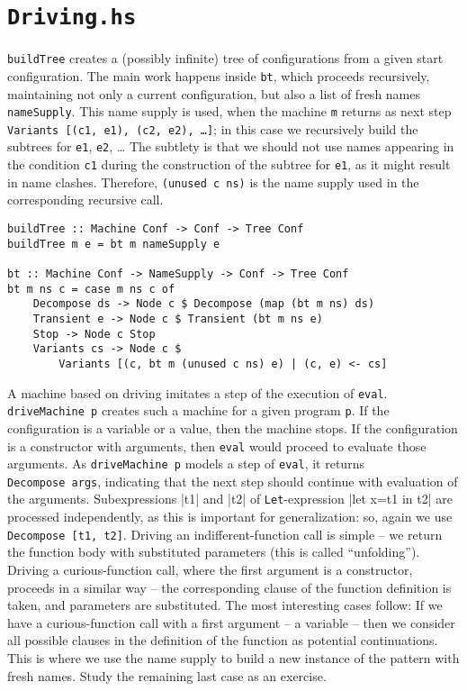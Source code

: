 \section{\texttt{Driving.hs}}

\texttt{buildTree} creates a (possibly infinite) tree of configurations from a given start configuration.
The main work happens inside \texttt{bt}, which proceeds recursively,
maintaining not only a current configuration, but also a list of fresh names \texttt{nameSupply}.
This name supply is used, when the machine \texttt{m} returns as next step
\texttt{Variants~[(c1,~e1),~(c2, e2),~\ldots]};
in this case we recursively build the subtrees for \texttt{e1}, \texttt{e2}, \ldots
The subtlety is that we should not use names appearing in the condition \texttt{c1}
during the construction of the subtree for \texttt{e1},
as it might result in name clashes.
Therefore, \texttt{(unused c ns)} is the name supply used in the corresponding recursive call.
\begin{lstlisting}[name=driving]
buildTree :: Machine Conf -> Conf -> Tree Conf
buildTree m e = bt m nameSupply e

bt :: Machine Conf -> NameSupply -> Conf -> Tree Conf
bt m ns c = case m ns c of
	Decompose ds -> Node c $ Decompose (map (bt m ns) ds)
	Transient e -> Node c $ Transient (bt m ns e)
	Stop -> Node c Stop
	Variants cs -> Node c $ 
		Variants [(c, bt m (unused c ns) e) | (c, e) <- cs]
\end{lstlisting}
A machine based on driving imitates a step of the execution of \texttt{eval}. 
\texttt{driveMachine~p} creates such a machine for a given program \texttt{p}.
If the configuration is a variable or a value, then the machine stops.
If the configuration is a constructor with arguments, then \texttt{eval}
would proceed to evaluate those arguments.
As \texttt{driveMachine~p} models a step of \texttt{eval},
it returns \texttt{Decompose~args},
indicating that the next step should continue with evaluation of the arguments.
Subexpressions |t1| and |t2| of \texttt{Let}-expression |let x=t1 in t2| are processed independently, as 
this is important for generalization: so, again we use \texttt{Decompose~[t1,~t2]}.
Driving an indifferent-function call is simple -- we return the function body
with substituted parameters (this is called ``unfolding'').
Driving a curious-function call, where the first argument is a constructor,
proceeds in a similar way -- the corresponding clause of the
function definition is taken, and parameters are substituted.
The most interesting cases follow:
If we have a curious-function call with a first argument -- a variable --
then we consider all possible clauses in the definition of the function
as potential continuations. This is where we use the name supply to 
build a new instance of the pattern with fresh names.
Study the remaining last case as an exercise.

